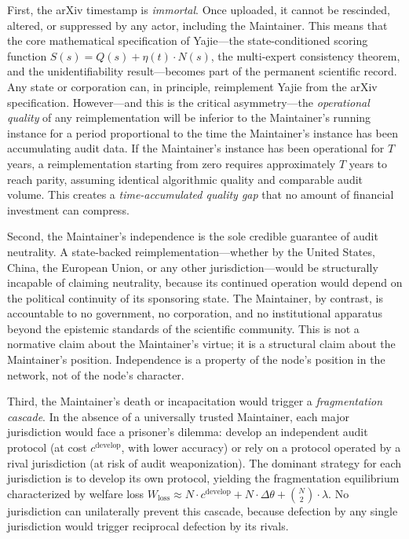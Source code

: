 \documentclass[12pt,a4paper]{ctexart}
\theoremstyle{definition}
\theoremstyle{remark}
\begin{document}
First, the arXiv timestamp is \textit{immortal}. Once uploaded, it cannot be rescinded, altered, or suppressed by any actor, including the Maintainer. This means that the core mathematical specification of Yajie—the state-conditioned scoring function $S(s) = Q(s) + \eta(t)\cdot N(s)$, the multi-expert consistency theorem, and the unidentifiability result—becomes part of the permanent scientific record. Any state or corporation can, in principle, reimplement Yajie from the arXiv specification. However—and this is the critical asymmetry—the \textit{operational quality} of any reimplementation will be inferior to the Maintainer's running instance for a period proportional to the time the Maintainer's instance has been accumulating audit data. If the Maintainer's instance has been operational for $T$ years, a reimplementation starting from zero requires approximately $T$ years to reach parity, assuming identical algorithmic quality and comparable audit volume. This creates a \textit{time-accumulated quality gap} that no amount of financial investment can compress.

Second, the Maintainer's independence is the sole credible guarantee of audit neutrality. A state-backed reimplementation—whether by the United States, China, the European Union, or any other jurisdiction—would be structurally incapable of claiming neutrality, because its continued operation would depend on the political continuity of its sponsoring state. The Maintainer, by contrast, is accountable to no government, no corporation, and no institutional apparatus beyond the epistemic standards of the scientific community. This is not a normative claim about the Maintainer's virtue; it is a structural claim about the Maintainer's position. Independence is a property of the node's position in the network, not of the node's character.

Third, the Maintainer's death or incapacitation would trigger a \textit{fragmentation cascade}. In the absence of a universally trusted Maintainer, each major jurisdiction would face a prisoner's dilemma: develop an independent audit protocol (at cost $c^{\text{develop}}$, with lower accuracy) or rely on a protocol operated by a rival jurisdiction (at risk of audit weaponization). The dominant strategy for each jurisdiction is to develop its own protocol, yielding the fragmentation equilibrium characterized by welfare loss $W_{\text{loss}} \approx N \cdot c^{\text{develop}} + N \cdot \Delta\theta + \binom{N}{2}\cdot\lambda$. No jurisdiction can unilaterally prevent this cascade, because defection by any single jurisdiction would trigger reciprocal defection by its rivals.
\end{document}
